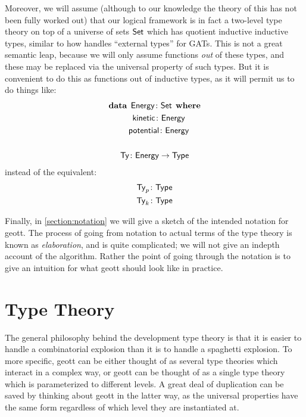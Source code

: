 \documentclass[fleqn,leqno]{article}
\begin{document}
Moreover, we will assume (although to our knowledge the theory of this has not been fully worked out) that our logical framework is in fact a two-level type theory on top of a universe of sets $\mathsf{Set}$ which has quotient inductive inductive types, similar to how \cite{kovacs-2022-typetheoretic} handles ``external types'' for GATs. This is not a great semantic leap, because we will only assume functions \emph{out} of these types, and these may be replaced via the universal property of such types. But it is convenient to do this as functions out of inductive types, as it will permit us to do things like:
\begin{gather*}
  \mathbf{data} \:\: \mathsf{Energy}\colon \mathsf{Set} \:\: \mathbf{where} \\
  \quad \mathsf{kinetic} \colon \mathsf{Energy} \\
  \quad \mathsf{potential} \colon \mathsf{Energy} \\
  \\
  \mathsf{Ty} \colon \mathsf{Energy} \to \mathsf{Type}
\end{gather*}
instead of the equivalent:
\begin{gather*}
  \mathsf{Ty}_p \colon \mathsf{Type} \\
  \mathsf{Ty}_k \colon \mathsf{Type}
\end{gather*}

Finally, in \cref{section:notation} we will give a sketch of the intended notation for geott. The process of going from notation to actual terms of the type theory is known as \emph{elaboration}, and is quite complicated; we will not give an indepth account of the algorithm. Rather the point of going through the notation is to give an intuition for what geott should look like in practice.

\section{Type Theory}

The general philosophy behind the development type theory is that it is easier to handle a combinatorial explosion than it is to handle a spaghetti explosion. To more specific, geott can be either thought of as several type theories which interact in a complex way, or geott can be thought of as a single type theory which is parameterized to different levels. A great deal of duplication can be saved by thinking about geott in the latter way, as the universal properties have the same form regardless of which level they are instantiated at.
\end{document}
